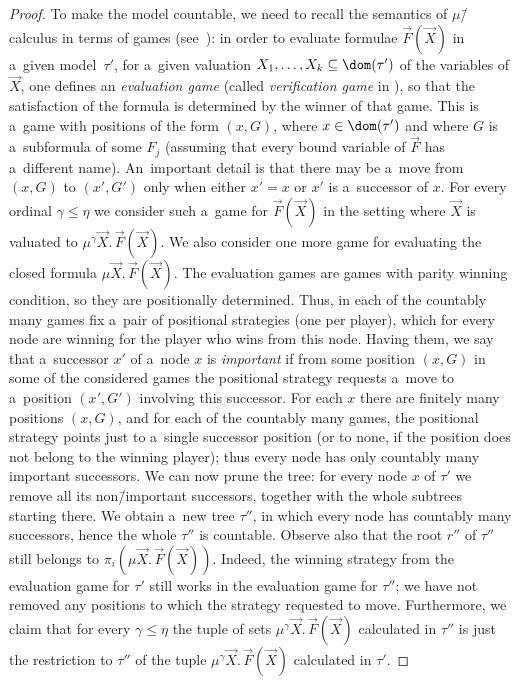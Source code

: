 \begin{proof}
	To make the model countable, we need to recall the semantics
	of $\mu$\=/calculus in terms of games (see~\cite[Section 26.2.3]{julian-igor-handook}):
	in order to evaluate formulae $\vec{F}(\vec{X})$ in a~given model~$\tau'$, for a~given valuation $X_1,\dots,X_k\subseteq\dom(\tau')$ of the variables of $\vec{X}$,
	one defines an \emph{evaluation game} (called \emph{verification game} in \cite{julian-igor-handook}), so that
	the satisfaction of the formula is determined by the winner of that game.
	This is a~game with positions of the form $(x,G)$, where $x\in\dom(\tau')$ and where $G$ is a~subformula of some $F_j$
	(assuming that every bound variable of $\vec{F}$ has a~different name).
	An~important detail is that there may be a~move from $(x,G)$ to $(x',G')$ only when either $x'=x$ or $x'$ is a~successor of $x$.
	For every ordinal $\gamma\leq\eta$ we consider such a~game for $\vec{F}(\vec{X})$ in the setting where $\vec{X}$ is valuated to $\mu^\gamma\vec{X}.\,\vec{F}(\vec{X})$.
	We also consider one more game for evaluating the closed formula $\mu\vec{X}.\,\vec{F}(\vec{X})$.
	The evaluation games are games with parity winning condition, so they are positionally determined.
	Thus, in each of the countably many games fix a~pair of positional strategies (one per player), which for every node are winning for the player who wins from this node.
	Having them, we say that a~successor $x'$ of a~node $x$ is \emph{important}
	if from some position $(x,G)$ in some of the considered games the positional strategy requests a~move to a~position $(x',G')$ involving this successor.
	For each $x$ there are finitely many positions $(x,G)$, and for each of the countably many games, the positional strategy points just to a~single successor position
	(or to none, if the position does not belong to the winning player); thus every node has only countably many important successors.
	We can now prune the tree: for every node $x$ of $\tau'$ we remove all its non\=/important successors, together with the whole subtrees starting there.
	We obtain a~new tree $\tau''$, in which every node has countably many successors, hence the whole $\tau''$ is countable.
	Observe also that the root $r''$ of $\tau''$ still belongs to $\pi_i(\mu\vec{X}.\,\vec{F}(\vec{X}))$.
	Indeed, the winning strategy from the evaluation game for $\tau'$ still works in the evaluation game for $\tau''$; we have not removed any positions to which the strategy requested to move.
	Furthermore, we claim that for every $\gamma\leq\eta$ the tuple of sets $\mu^\gamma\vec{X}.\,\vec{F}(\vec{X})$ calculated in $\tau''$
	is just the restriction to $\tau''$ of the tuple $\mu^\gamma\vec{X}.\,\vec{F}(\vec{X})$ calculated in $\tau'$.

\end{proof}
